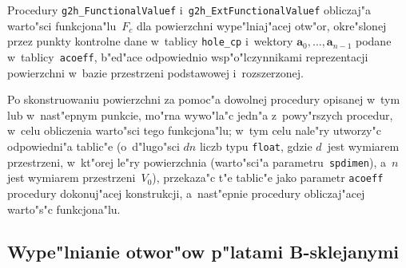 \vspace{\bigskipamount}
Procedury \texttt{g2h\_FunctionalValuef} i~\texttt{g2h\_ExtFunctionalValuef}
obliczaj"a warto"sci funkcjona"lu~$F_c$ dla powierzchni wype"lniaj"acej
otw"or, okre"slonej przez punkty kontrolne dane w~tablicy \texttt{hole\_cp}
i~wektory $\bm{a}_0,\ldots,\bm{a}_{n-1}$ podane w~tablicy~\texttt{acoeff},
b"ed"ace odpowiednio wsp"o"lczynnikami reprezentacji powierzchni w~bazie
przestrzeni podstawowej i~rozszerzonej.

Po skonstruowaniu powierzchni za pomoc"a dowolnej procedury opisanej w~tym
lub w~nast"epnym punkcie, mo"rna wywo"la"c jedn"a z~powy"rszych procedur,
w~celu obliczenia warto"sci tego funkcjona"lu; w~tym celu nale"ry utworzy"c
odpowiedni"a tablic"e (o~d"lugo"sci $dn$ liczb typu \texttt{float}, gdzie
$d$~jest wymiarem przestrzeni, w~kt"orej le"ry powierzchnia (warto"sci"a
parametru~\texttt{spdimen}), a~$n$ jest wymiarem przestrzeni~$V_0$),
przekaza"c t"e tablic"e jako parametr \texttt{acoeff} procedury dokonuj"acej
konstrukcji, a~nast"epnie procedury obliczaj"acej warto"s"c funkcjona"lu.

\subsection{Wype"lnianie otwor"ow p"latami B-sklejanymi}


\vspace{\bigskipamount}

\vspace{\bigskipamount}

\vspace{\bigskipamount}

